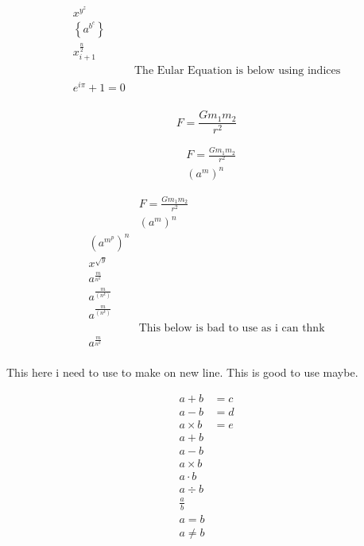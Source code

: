 \documentclass[12pt, letterpaper]{article}
\begin{document}
\[
\begin{aligned}
    x^{y^z}  \\
    \left\{a^{b^c}\right\} \\
    x_{i+1}^{\frac{n}{2}} \\
    & \text{The Eular Equation is below using indices} \\
    e^{i\pi} + 1 = 0 \\
\end{aligned}
\]

$$
F = \frac{G m_1 m_2}{r^2}
$$

\begin{align*}
& F = \frac{G m_1 m_2}{r^2} \\
& (a^m)^n
\end{align*}


\[
\begin{aligned}
    & F = \frac{G m_1 m_2 }{r^2} \\
    & (a^m)^n \\
    \left(a^{m^p}\right)^n \\
    x^{\sqrt{y}} \\
    a^{\frac{m}{n^k}} \\
    a^{\frac{m}{(n^k)}} \\
    a^{\frac{m}{\left(n^k\right)}} \\
    & \text{This below is bad to use as i can thnk} \\
    a^{\displaystyle\frac{m}{n^k}} \\
\end{aligned}
\]





\newpage



This here i need to use to make on new line. This is good to use maybe.


$$
\begin{aligned}
a + b &= c \\
a - b &= d \\
a \times b &= e\\
a + b \\
a - b \\
a \times b \\
a \cdot b \\
a \div b \\
\frac{a}{b} \\
a = b \\
a \neq b \\
\end{aligned}
$$
\end{document}
